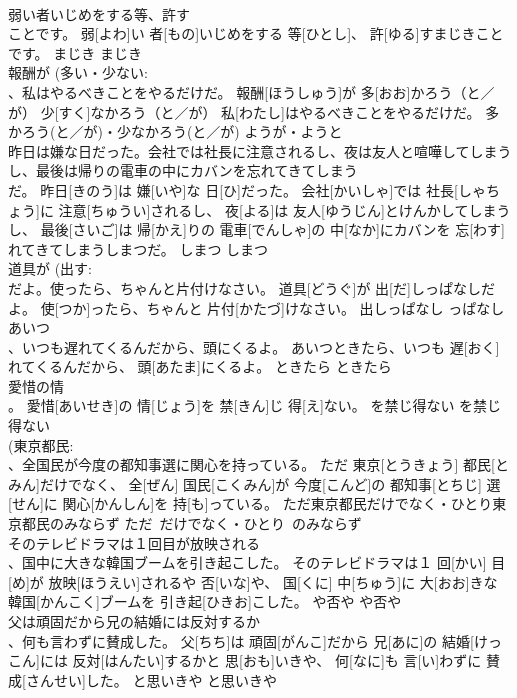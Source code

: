 \documentclass[8pt]{extreport}
\begin{document}
\begin{CJK}{UTF8}{min}
\\	弱い者いじめをする等、許す 
\\	ことです。	弱[よわ]い 者[もの]いじめをする 等[ひとし]、 許[ゆる]すまじきことです。	まじき	まじき	
\\	報酬が (多い・少ない: 
\\	、私はやるべきことをやるだけだ。	報酬[ほうしゅう]が 多[おお]かろう（と／が） 少[すく]なかろう（と／が） 私[わたし]はやるべきことをやるだけだ。	多かろう(と／が)・少なかろう(と／が)	ようが・ようと	
\\	昨日は嫌な日だった。会社では社長に注意されるし、夜は友人と喧嘩してしまうし、最後は帰りの電車の中にカバンを忘れてきてしまう 
\\	だ。	昨日[きのう]は 嫌[いや]な 日[ひ]だった。 会社[かいしゃ]では 社長[しゃちょう]に 注意[ちゅうい]されるし、 夜[よる]は 友人[ゆうじん]とけんかしてしまうし、 最後[さいご]は 帰[かえ]りの 電車[でんしゃ]の 中[なか]にカバンを 忘[わす]れてきてしまうしまつだ。	しまつ	しまつ	
\\	道具が (出す: 
\\	だよ。使ったら、ちゃんと片付けなさい。	道具[どうぐ]が 出[だ]しっぱなしだよ。 使[つか]ったら、ちゃんと 片付[かたづ]けなさい。	出しっぱなし	っぱなし	
\\	あいつ 
\\	、いつも遅れてくるんだから、頭にくるよ。	あいつときたら、いつも 遅[おく]れてくるんだから、 頭[あたま]にくるよ。	ときたら	ときたら	
\\	愛惜の情 
\\	。	愛惜[あいせき]の 情[じょう]を 禁[きん]じ 得[え]ない。	を禁じ得ない	を禁じ得ない	
\\	(東京都民: 
\\	、全国民が今度の都知事選に関心を持っている。	ただ 東京[とうきょう] 都民[とみん]だけでなく、 全[ぜん] 国民[こくみん]が 今度[こんど]の 都知事[とちじ] 選[せん]に 関心[かんしん]を 持[も]っている。	ただ東京都民だけでなく・ひとり東京都民のみならず	ただ~だけでなく・ひとり~のみならず	
\\	そのテレビドラマは１回目が放映される 
\\	、国中に大きな韓国ブームを引き起こした。	そのテレビドラマは１ 回[かい] 目[め]が 放映[ほうえい]されるや 否[いな]や、 国[くに] 中[ちゅう]に 大[おお]きな 韓国[かんこく]ブームを 引き起[ひきお]こした。	や否や	や否や	
\\	父は頑固だから兄の結婚には反対するか 
\\	、何も言わずに賛成した。	父[ちち]は 頑固[がんこ]だから 兄[あに]の 結婚[けっこん]には 反対[はんたい]するかと 思[おも]いきや、 何[なに]も 言[い]わずに 賛成[さんせい]した。	と思いきや	と思いきや	

\end{CJK}
\end{document}
